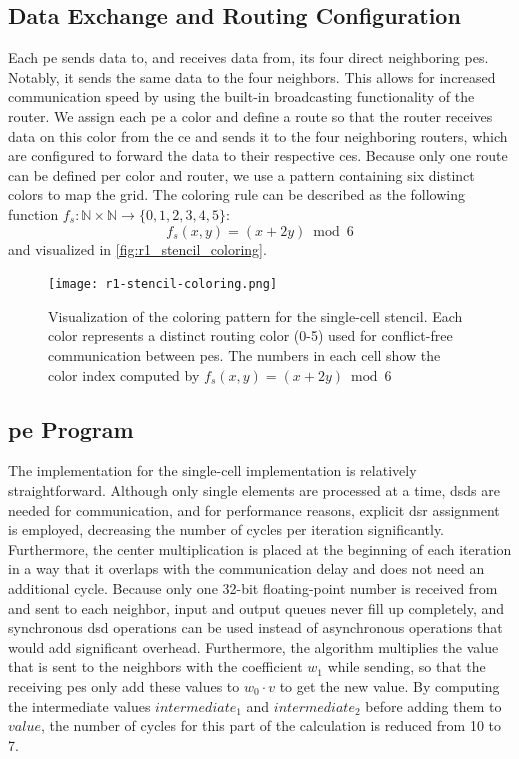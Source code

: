 \subsection{Data Exchange and Routing Configuration}
Each \ac{pe} sends data to, and receives data from, its four direct neighboring \acp{pe}. Notably, it sends the same data to the four neighbors. This allows for increased communication speed by using the built-in broadcasting functionality of the router. We assign each \ac{pe} a color and define a route so that the router receives data on this color from the \ac{ce} and sends it to the four neighboring routers, which are configured to forward the data to their respective \acp{ce}. Because only one route can be defined per color and router, we use a pattern containing six distinct colors to map the grid.
The coloring rule can be described as the following function $f_s:\mathbb{N}\times\mathbb{N}\to\{0,1,2,3,4,5\}$:
\begin{equation}
    \label{eq:coloring_function}
    f_s(x,y) = (x + 2y) \bmod 6
\end{equation}
and visualized in \autoref{fig:r1_stencil_coloring}.
\begin{figure}
    \centering
    \texttt{[image: r1-stencil-coloring.png]}
    \caption{Visualization of the coloring pattern for the single-cell stencil. Each color represents a distinct routing color (0-5) used for conflict-free communication between \acp{pe}. The numbers in each cell show the color index computed by $f_s(x,y) = (x + 2y) \bmod 6$}
    \label{fig:r1_stencil_coloring}
\end{figure}

\subsection{\ac{pe} Program}
The implementation for the single-cell implementation is relatively straightforward.
Although only single elements are processed at a time, \acp{dsd} are needed for communication, and for performance reasons, explicit \ac{dsr} assignment is employed, decreasing the number of cycles per iteration significantly.  
Furthermore, the center multiplication is placed at the beginning of each iteration in a way that it overlaps with the communication delay and does not need an additional cycle.
Because only one 32-bit floating-point number is received from and sent to each neighbor, input and output queues never fill up completely, and synchronous \ac{dsd} operations can be used instead of asynchronous operations that would add significant overhead.
Furthermore, the algorithm multiplies the value that is sent to the neighbors with the coefficient $w_1$ while sending, so that the receiving \acp{pe} only add these values to $w_0 \cdot v$ to get the new value.
By computing the intermediate values $intermediate_1$ and $intermediate_2$ before adding them to $value$, the number of cycles for this part of the calculation is reduced from 10 to 7.

